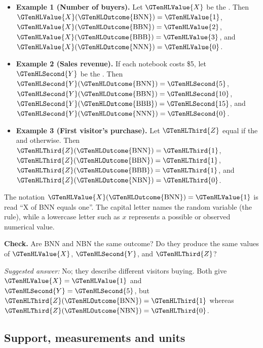 \begin{itemize}
	\item \textbf{Example 1 (Number of buyers).}
	Let $\GTenHLValue{X}$ be the .
	Then $\GTenHLValue{X}(\GTenHLOutcome{\mathrm{BNN}})=\GTenHLValue{1}$, $\GTenHLValue{X}(\GTenHLOutcome{\mathrm{BBN}})=\GTenHLValue{2}$,
	$\GTenHLValue{X}(\GTenHLOutcome{\mathrm{BBB}})=\GTenHLValue{3}$, and $\GTenHLValue{X}(\GTenHLOutcome{\mathrm{NNN}})=\GTenHLValue{0}$.
	
	\item \textbf{Example 2 (Sales revenue).}
	If each notebook costs \$5, let $\GTenHLSecond{Y}$ be the .
	Then $\GTenHLSecond{Y}(\GTenHLOutcome{\mathrm{BNN}})=\GTenHLSecond{5}$, $\GTenHLSecond{Y}(\GTenHLOutcome{\mathrm{BBN}})=\GTenHLSecond{10}$,
	$\GTenHLSecond{Y}(\GTenHLOutcome{\mathrm{BBB}})=\GTenHLSecond{15}$, and $\GTenHLSecond{Y}(\GTenHLOutcome{\mathrm{NNN}})=\GTenHLSecond{0}$.
	
	\item \textbf{Example 3 (First visitor's purchase).}
	Let $\GTenHLThird{Z}$ equal  if the 
	and  otherwise. Then $\GTenHLThird{Z}(\GTenHLOutcome{\mathrm{BNN}})=\GTenHLThird{1}$,
	$\GTenHLThird{Z}(\GTenHLOutcome{\mathrm{BBN}})=\GTenHLThird{1}$, $\GTenHLThird{Z}(\GTenHLOutcome{\mathrm{BBB}})=\GTenHLThird{1}$,
	and $\GTenHLThird{Z}(\GTenHLOutcome{\mathrm{NBN}})=\GTenHLThird{0}$.
\end{itemize}

The notation $\GTenHLValue{X}(\GTenHLOutcome{\mathrm{BNN}})=\GTenHLValue{1}$ is read ``X of BNN equals one''. The capital letter names the random variable (the rule), while a lowercase letter such as $x$ represents a possible or observed numerical value.

\textbf{Check.} Are BNN and NBN the same outcome? Do they produce the same values of $\GTenHLValue{X}$, $\GTenHLSecond{Y}$, and $\GTenHLThird{Z}$?

\emph{Suggested answer:} No; they describe different visitors buying. Both give $\GTenHLValue{X}=\GTenHLValue{1}$ and $\GTenHLSecond{Y}=\GTenHLSecond{5}$, but $\GTenHLThird{Z}(\GTenHLOutcome{\mathrm{BNN}})=\GTenHLThird{1}$ whereas $\GTenHLThird{Z}(\GTenHLOutcome{\mathrm{NBN}})=\GTenHLThird{0}$.


\subsection{Support, measurements and units}

